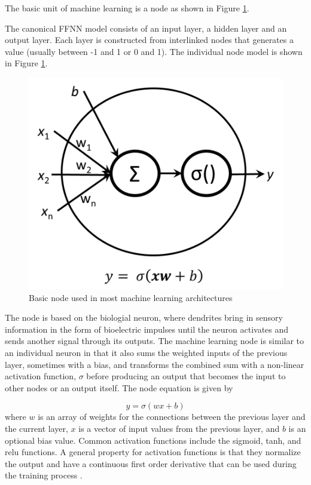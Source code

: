 \documentclass[twoside,twocolumn]{article}
\begin{document}
The basic unit of machine learning is a node as shown in  Figure \ref{fig:node}.


The canonical FFNN model consists of an input layer, a hidden layer and an output layer. Each layer is constructed from interlinked nodes that generates a value (usually between -1 and 1 or 0 and 1). The individual node model is shown in Figure \ref{fig:node}. \\
%
%
\begin{figure}[]
\centering
\includegraphics[width=\columnwidth]{images/node.png}  %
\caption{Basic node used in most machine learning architectures }
\label{fig:node}
\end{figure}
%
The node is based on the biologial neuron, where dendrites bring in sensory information in the form of bioelectric impulses until the neuron activates and sends another signal through its outputs. The machine learning node is similar to an individual neuron in that it also sums the weighted inputs of the previous layer, sometimes with a bias, and transforms the combined sum with a non-linear activation function, $\sigma$ before producing an output that becomes the input to other nodes or an output itself. The node  equation is given by

\begin{equation}
\label{eq:perceptron}
y= \sigma(wx+b)
\end{equation}
\noindent
where $w$ is an array of weights for the connections between the previous layer and the current layer, $x$ is a vector of input values from the previous layer, and $b$ is an optional bias value. Common activation functions include the sigmoid, tanh, and relu functions. A general property for activation functions is that they normalize the output and have a continuous first order derivative that can be used during the training process \citep{Goodfellow2016}. 
\end{document}
